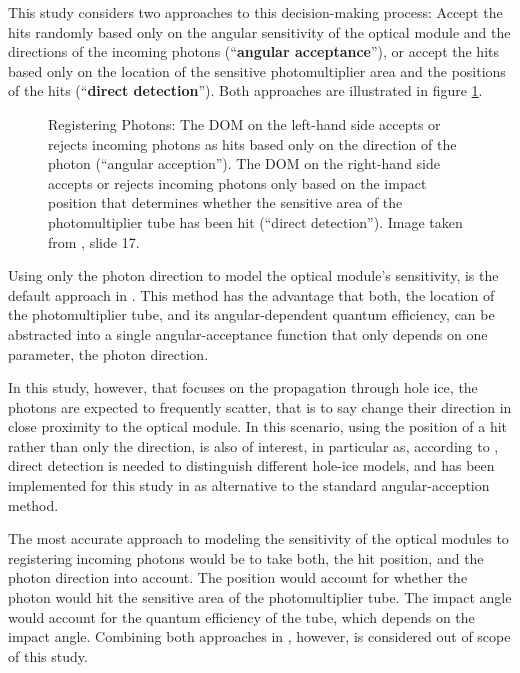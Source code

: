 This study considers two approaches to this decision-making process: Accept the hits randomly based only on the angular sensitivity of the optical module and the directions of the incoming photons (\enquote{\textbf{angular acceptance}}), or accept the hits based only on the location of the sensitive photomultiplier area and the positions of the hits (\enquote{\textbf{direct detection}}). Both approaches are illustrated in figure \ref{fig:kieQuoh1}.

\begin{figure}[htbp]
  \centering
  \caption{Registering Photons: The DOM on the left-hand side accepts or rejects incoming photons as hits based only on the direction of the photon (``angular acception''). The DOM on the right-hand side accepts or rejects incoming photons only based on the impact position that determines whether the sensitive area of the photomultiplier tube has been hit (``direct detection''). Image taken from \cite{martinspicehddard}, slide 17.}
  \label{fig:kieQuoh1}
\end{figure}

Using only the photon direction to model the optical module's sensitivity, is the default approach in . This method has the advantage that both, the location of the photomultiplier tube, and its angular-dependent quantum efficiency, can be abstracted into a single angular-acceptance function that only depends on one parameter, the photon direction.

In this study, however, that focuses on the propagation through hole ice, the photons are expected to frequently scatter, that is to say change their direction in close proximity to the optical module. In this scenario, using the position of a hit rather than only the direction, is also of interest, in particular as, according to  \cite{martinspicehddard}, direct detection is needed to distinguish different hole-ice models, and has been implemented for this study in  as alternative to the standard angular-acception method.


The most accurate approach to modeling the sensitivity of the optical modules to registering incoming photons would be to take both, the hit position, and the photon direction into account. The position would account for whether the photon would hit the sensitive area of the photomultiplier tube. The impact angle would account for the quantum efficiency of the tube, which depends on the impact angle. Combining both approaches in , however, is considered out of scope of this study.

